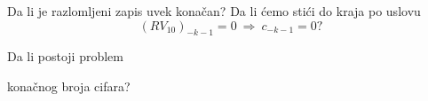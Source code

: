 \begin{frame}[label=04-s011]{Da li je razlomljeni zapis uvek konačan?}
\centering
Da li ćemo stići do kraja po uslovu
\[(RV_{10})_{-k-1}=0\ \Rightarrow\ c_{-k-1}=0?\]
\par\vspace{6mm}
{\fontsize{18}{23}\selectfont\color{DEcrvena}Da li postoji problem\par konačnog broja cifara?\par}
\end{frame}
